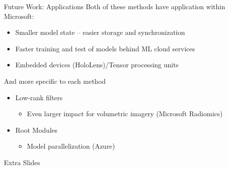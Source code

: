 \documentclass[t,xcolor=dvipsnames]{beamer}
\begin{document}
\begin{frame}{Future Work: Applications}
    Both of these methods have application within Microsoft:
    \begin{itemize}
        \item Smaller model state -- easier storage and synchronization
        \item Faster training and test of models behind ML cloud services
        \item Embedded devices (HoloLens)/Tensor processing units
    \end{itemize}
    And more specific to each method
    \begin{itemize}
        \item Low-rank filters
        \begin{itemize}
            \item Even larger impact for volumetric imagery (Microsoft Radiomics)
        \end{itemize}
        \item Root Modules
        \begin{itemize}
            \item Model parallelization (Azure)
        \end{itemize}
    \end{itemize}
\end{frame}


\begin{frame}{}
\centering
Extra Slides
\end{frame}
\end{document}
